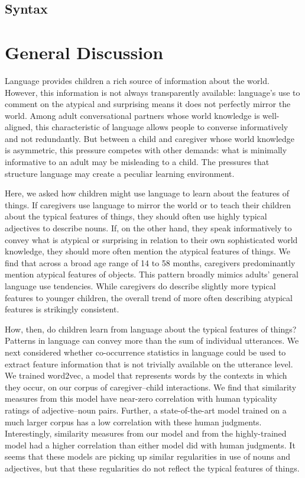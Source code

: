 \documentclass[10pt, letterpaper]{article}
\begin{document}
\hypertarget{syntax}{%
\subsection{Syntax}\label{syntax}}

\hypertarget{general-discussion}{%
\section{General Discussion}\label{general-discussion}}

Language provides children a rich source of information about the world.
However, this information is not always transparently available:
language's use to comment on the atypical and surprising means it does
not perfectly mirror the world. Among adult conversational partners
whose world knowledge is well-aligned, this characteristic of language
allows people to converse informatively and not redundantly. But between
a child and caregiver whose world knowledge is asymmetric, this pressure
competes with other demands: what is minimally informative to an adult
may be misleading to a child. The pressures that structure language may
create a peculiar learning environment.

Here, we asked how children might use language to learn about the
features of things. If caregivers use language to mirror the world or to
teach their children about the typical features of things, they should
often use highly typical adjectives to describe nouns. If, on the other
hand, they speak informatively to convey what is atypical or surprising
in relation to their own sophisticated world knowledge, they should more
often mention the atypical features of things. We find that across a
broad age range of 14 to 58 months, caregivers predominantly mention
atypical features of objects. This pattern broadly mimics adults'
general language use tendencies. While caregivers do describe slightly
more typical features to younger children, the overall trend of more
often describing atypical features is strikingly consistent.

How, then, do children learn from language about the typical features of
things? Patterns in language can convey more than the sum of individual
utterances. We next considered whether co-occurrence statistics in
language could be used to extract feature information that is not
trivially available on the utterance level. We trained word2vec, a model
that represents words by the contexts in which they occur, on our corpus
of caregiver--child interactions. We find that similarity measures from
this model have near-zero correlation with human typicality ratings of
adjective--noun pairs. Further, a state-of-the-art model trained on a
much larger corpus has a low correlation with these human judgments.
Interestingly, similarity measures from our model and from the
highly-trained model had a higher correlation than either model did with
human judgments. It seems that these models are picking up similar
regularities in use of nouns and adjectives, but that these regularities
do not reflect the typical features of things.
\end{document}
